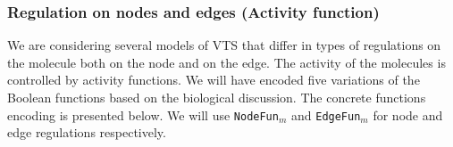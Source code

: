 


\subsubsection{Regulation on nodes and edges (Activity function)}
We are considering several models of VTS that differ in types of regulations on the molecule both on the node and on the edge.  
%
%
The activity of the molecules is controlled by activity functions.
%
We will have encoded five variations of the Boolean functions based on the biological discussion.
%
The concrete functions encoding is presented below.
%
We will use \texttt{NodeFun}$_m$ and \texttt{EdgeFun}$_m$ for node and edge regulations respectively.
%

